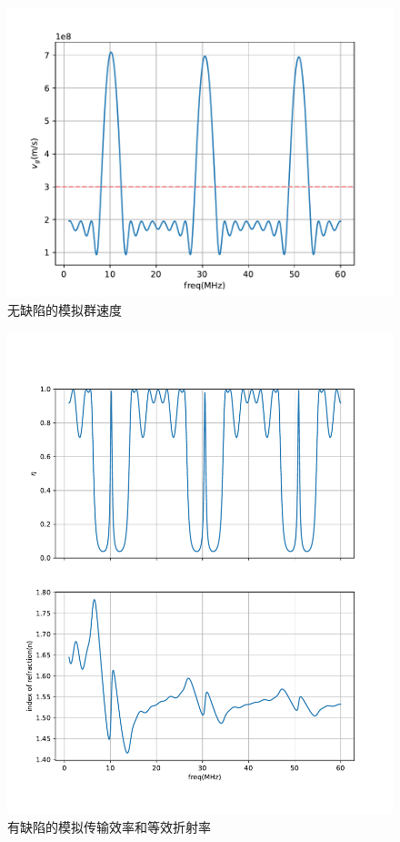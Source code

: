 \documentclass[fleqn,10pt]{SelfArx} %
\begin{document}
\begin{figure}[htbp]
	\centering
	\includegraphics[width=\linewidth]{sim-vg.pdf}
	\caption{无缺陷的模拟群速度}
	\label{fig:a10}
\end{figure}
\begin{figure}[htbp]
	\centering
	\includegraphics[width=\linewidth]{simd-eta-n.pdf}
	\caption{有缺陷的模拟传输效率和等效折射率}
	\label{fig:a11}
\end{figure}
\end{document}
